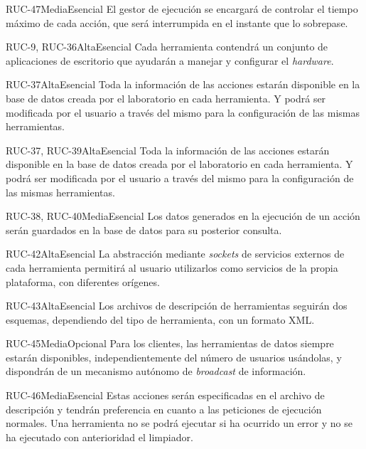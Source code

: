 {RUC-47}{Media}{Esencial}
{
El gestor de ejecución se encargará de controlar el tiempo máximo de 
cada acción, que será interrumpida en el instante que lo sobrepase.
}

{RUC-9, RUC-36}{Alta}{Esencial}
{
Cada herramienta contendrá un conjunto de aplicaciones de escritorio 
que ayudarán a manejar y configurar el \emph{hardware}.
}

{RUC-37}{Alta}{Esencial}
{
Toda la información de las acciones estarán disponible en la base de 
datos creada por el laboratorio en cada herramienta. Y podrá ser 
modificada por el usuario a través del mismo para la configuración de 
las mismas herramientas.
}

{RUC-37, RUC-39}{Alta}{Esencial}
{
Toda la información de las acciones estarán disponible en la base de 
datos creada por el laboratorio en cada herramienta. Y podrá ser 
modificada por el usuario a través del mismo para la configuración de 
las mismas herramientas.
}

{RUC-38, RUC-40}{Media}{Esencial}
{
Los datos generados en la ejecución de un acción serán guardados en 
la base de datos para su posterior consulta.
}

{RUC-42}{Alta}{Esencial}
{
La abstracción mediante \emph{sockets} de servicios externos de cada 
herramienta permitirá al usuario utilizarlos como servicios de la 
propia plataforma, con diferentes orígenes.
}

{RUC-43}{Alta}{Esencial}
{
Los archivos de descripción de herramientas seguirán dos esquemas, 
dependiendo del tipo de herramienta, con un formato XML.
}

{RUC-45}{Media}{Opcional}
{
Para los clientes, las herramientas de datos siempre estarán 
disponibles, independientemente del número de usuarios usándolas, y 
dispondrán de un mecanismo autónomo de \emph{broadcast} de información.
}

{RUC-46}{Media}{Esencial}
{
Estas acciones serán especificadas en el archivo de descripción y 
tendrán preferencia en cuanto a las peticiones de ejecución normales. 
Una herramienta no se podrá ejecutar si ha ocurrido un error y no se 
ha ejecutado con anterioridad el limpiador.
}


